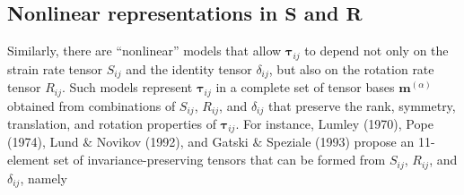 \subsection{Nonlinear representations in $\mathbf{S}$ and $\mathbf{R}$} 
\label{sec:1A2}

Similarly, there are ``nonlinear'' models that allow $\mathbf{\tau}_{ij}$  to depend not only on the strain rate tensor $S_{ij}$  and the identity tensor $\delta_{ij}$, but also on the rotation rate tensor $R_{ij}$. Such models represent  $\mathbf{\tau}_{ij}$  in a complete set of tensor bases  $\mathbf{m}^{(\alpha)}$ obtained from combinations of $S_{ij}$, $R_{ij}$, and $\delta_{ij}$  that preserve the rank, symmetry, translation, and rotation properties of $\mathbf{\tau}_{ij}$. For instance, Lumley (1970), Pope (1974), Lund $\&$ Novikov (1992), and Gatski $\&$ Speziale (1993) propose an 11-element set of invariance-preserving tensors   that can be formed from $S_{ij}$, $R_{ij}$, and $\delta_{ij}$, namely
%
